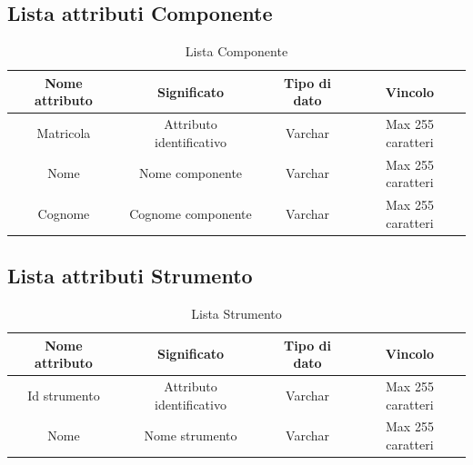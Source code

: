 \documentclass[12pt]{article}
\begin{document}
\subsection*{Lista attributi Componente}
\begin{table}[h!]
    \centering
    \begin{tabular}{|c|c|c|c|}
        \hline
        Nome attributo & Significato & Tipo di dato & Vincolo \\
        \hline
         Matricola & Attributo identificativo & Varchar & Max 255 caratteri \\
        \hline
        Nome & Nome componente & Varchar & Max 255 caratteri \\
        \hline
        Cognome & Cognome componente & Varchar & Max 255 caratteri \\
        \hline
    \end{tabular}
    \caption{Lista Componente}
    \label{tab: tabella entità componente}
\end{table}

\clearpage


\subsection*{Lista attributi Strumento}

\begin{table}[h!]
    \centering
    \begin{tabular}{|c|c|c|c|}
        \hline
        Nome attributo & Significato & Tipo di dato & Vincolo \\
        \hline
        Id strumento & Attributo identificativo & Varchar & Max 255 caratteri \\
        \hline
        Nome & Nome strumento & Varchar & Max 255 caratteri \\
        \hline
    \end{tabular}
    \caption{Lista Strumento}
    \label{tab: tabella entità strumento}
\end{table}
\end{document}
